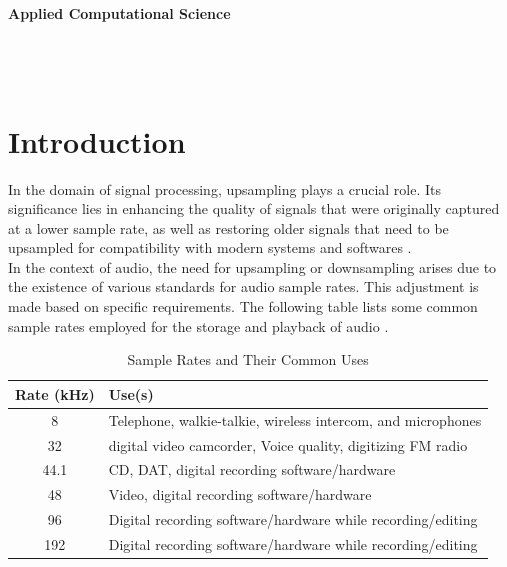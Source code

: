 \documentclass{article}
\begin{document}
\begin{center}
\textbf{\textcolor{RedOrange}{Applied Computational Science}} \\
\vspace{0.5em}
 \\
\vspace{1em}
\\ 
\vspace{0.5em}
\\
\end{center}

\noindent
\hrulefill

\section{Introduction}

In the domain of signal processing, upsampling plays a crucial role. Its significance lies in enhancing the quality of signals that were originally captured at a lower sample rate, as well as restoring older signals that need to be upsampled for compatibility with modern systems and softwares \cite{wiki_ai} \cite{wiki_us}. \\

In the context of audio, the need for upsampling or downsampling arises due to the existence of various standards for audio sample rates. This adjustment is made based on specific requirements. The following table lists some common sample rates employed for the storage and playback of audio \cite{sampleRates}.

\begin{table}[h]
    \centering
    \caption{Sample Rates and Their Common Uses }
    \begin{tabular}{|c|l|}
        \hline
        \textbf{Rate (kHz)} & \textbf{Use(s)} \\
        \hline
        8 & Telephone, walkie-talkie, wireless intercom, and microphones \\
        \hline
        32 & digital video camcorder, Voice quality, digitizing FM radio \\
        \hline
        44.1 & CD, DAT, digital recording software/hardware \\
        \hline
        48 & Video, digital recording software/hardware \\
        \hline
        96 & Digital recording software/hardware while recording/editing \\
        \hline
        192 & Digital recording software/hardware while recording/editing \\
        \hline
    \end{tabular}
\end{table}
\end{document}
